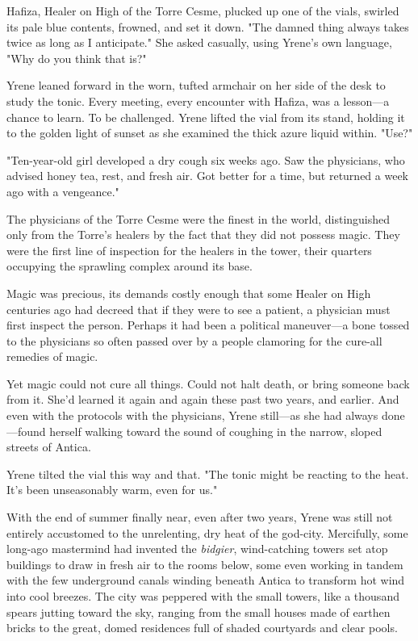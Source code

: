 Hafiza, Healer on High of the Torre Cesme, plucked up one of the vials, swirled its pale blue contents, frowned, and set it down. "The damned thing always takes twice as long as I anticipate." She asked casually, using Yrene's own language, "Why do you think that is?"

Yrene leaned forward in the worn, tufted armchair on her side of the desk to study the tonic. Every meeting, every encounter with Hafiza, was a lesson---a chance to learn. To be challenged. Yrene lifted the vial from its stand, holding it to the golden light of sunset as she examined the thick azure liquid within. "Use?"

"Ten-year-old girl developed a dry cough six weeks ago. Saw the physicians, who advised honey tea, rest, and fresh air. Got better for a time, but returned a week ago with a vengeance."

The physicians of the Torre Cesme were the finest in the world, distinguished only from the Torre's healers by the fact that they did not possess magic. They were the first line of inspection for the healers in the tower, their quarters occupying the sprawling complex around its base.

Magic was precious, its demands costly enough that some Healer on High centuries ago had decreed that if they were to see a patient, a physician must first inspect the person. Perhaps it had been a political maneuver---a bone tossed to the physicians so often passed over by a people clamoring for the cure-all remedies of magic.

Yet magic could not cure all things. Could not halt death, or bring someone back from it. She'd learned it again and again these past two years, and earlier. And even with the protocols with the physicians, Yrene still---as she had always done---found herself walking toward the sound of coughing in the narrow, sloped streets of Antica.

Yrene tilted the vial this way and that. "The tonic might be reacting to the heat. It's been unseasonably warm, even for us."

With the end of summer finally near, even after two years, Yrene was still not entirely accustomed to the unrelenting, dry heat of the god-city. Mercifully, some long-ago mastermind had invented the \emph{bidgier}, wind-catching towers set atop buildings to draw in fresh air to the rooms below, some even working in tandem with the few underground canals winding beneath Antica to transform hot wind into cool breezes. The city was peppered with the small towers, like a thousand spears jutting toward the sky, ranging from the small houses made of earthen bricks to the great, domed residences full of shaded courtyards and clear pools.

